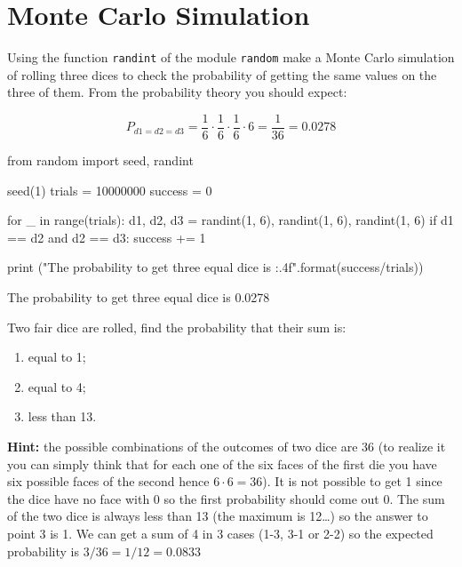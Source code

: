 \chapter{Monte Carlo Simulation}
\label{ex-montecarlo}

\begin{question}
Using the function \texttt{randint} of the module \texttt{random} make a Monte Carlo simulation of rolling three dices to check the probability of getting the same values on the three of them.
From the probability theory you should expect:

\[P_{d1=d2=d3} = \frac{1}{6}\cdot\frac{1}{6}\cdot\frac{1}{6}\cdot 6 = \frac{1}{36} = 0.0278\]
\end{question}

\begin{solution}
\end{solution}

\begin{ipython}
from random import seed, randint

seed(1)
trials = 10000000
success = 0

for _ in range(trials):
    d1, d2, d3 = randint(1, 6), randint(1, 6), randint(1, 6)
    if d1 == d2 and d2 == d3:
        success += 1

print ("The probability to get three equal dice is {:.4f}".format(success/trials))

The probability to get three equal dice is 0.0278
\end{ipython}

\begin{question}
Two fair dice are rolled, find the probability that their sum is:
\begin{enumerate}[start=1]
	\item equal to 1;
	\item equal to 4;
	\item less than 13.
\end{enumerate}
	
\noindent\textbf{Hint:} the possible combinations of the outcomes of two dice are 36 (to realize it you can simply think that for each one of the six faces of the first die you have six possible faces of the second hence $6\cdot 6=36$). It is not possible to get 1 since the dice have no face with 0 so the first probability should come out 0. The sum of the two dice is always less than 13 (the maximum is 12\ldots) so the answer to point 3 is 1. We can get a sum of 4 in 3 cases (1-3, 3-1 or 2-2) so the expected probability is $3/36=1/12=0.0833$
\end{question}

